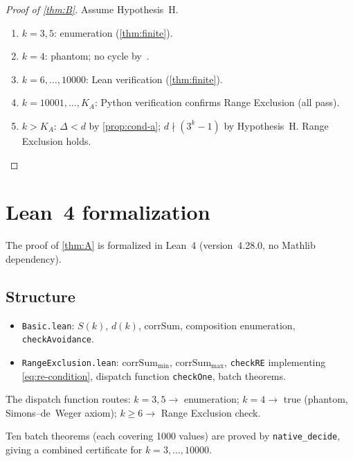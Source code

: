 \documentclass[11pt, a4paper]{amsart}
\theoremstyle{plain}
\theoremstyle{definition}
\theoremstyle{remark}
\newcommand{\corrSum}{\mathrm{corrSum}}
\begin{document}
\begin{proof}[Proof of \cref{thm:B}]
  Assume Hypothesis~H.
  \begin{enumerate}[label=(\roman*)]
    \item $k = 3, 5$: enumeration (\cref{thm:finite}).
    \item $k = 4$: phantom; no cycle by~\cite{SimonsDeWeger2005}.
    \item $k = 6, \ldots, 10000$: Lean verification
          (\cref{thm:finite}).
    \item $k = 10001, \ldots, K_A$: Python verification
          confirms Range Exclusion (all pass).
    \item $k > K_A$: $\Delta < d$ by \cref{prop:cond-a};
          $d \nmid (3^k-1)$ by Hypothesis~H.
          Range Exclusion holds. \qedhere
  \end{enumerate}
\end{proof}

\section{Lean~4 formalization}\label{sec:lean}

The proof of \cref{thm:A} is formalized in Lean~4
(version~4.28.0, no Mathlib dependency).

\subsection{Structure}

\begin{itemize}
  \item \texttt{Basic.lean}: $S(k)$, $d(k)$, $\corrSum$,
    composition enumeration, \texttt{checkAvoidance}.
  \item \texttt{RangeExclusion.lean}: $\corrSum_{\min}$,
    $\corrSum_{\max}$, \texttt{checkRE} implementing
    \eqref{eq:re-condition}, dispatch function
    \texttt{checkOne}, batch theorems.
\end{itemize}

The dispatch function routes:
$k = 3, 5 \to$ enumeration;
$k = 4 \to$ true (phantom, Simons--de~Weger axiom);
$k \geq 6 \to$ Range Exclusion check.

Ten batch theorems (each covering 1000 values) are proved
by \texttt{native\_decide}, giving a combined certificate
for $k = 3, \ldots, 10000$.
\end{document}
